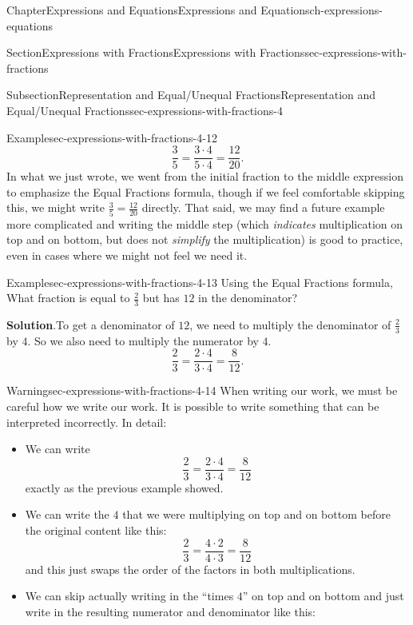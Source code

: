 \documentclass[twoside,11pt,]{book}
\newcommand{\blocktitlefont}{\relax}
\numberwithin{equation}{chapter}
\begin{document}
\begin{chapterptx}{Chapter}{Expressions and Equations}{}{Expressions and Equations}{}{}{ch-expressions-equations}
\begin{sectionptx}{Section}{Expressions with Fractions}{}{Expressions with Fractions}{}{}{sec-expressions-with-fractions}
\begin{subsectionptx}{Subsection}{Representation and Equal\slash{}Unequal Fractions}{}{Representation and Equal\slash{}Unequal Fractions}{}{}{sec-expressions-with-fractions-4}
\begin{example}{Example}{}{sec-expressions-with-fractions-4-12}
\begin{equation*}
\frac35=\frac{3 \cdot 4}{5 \cdot 4}=\frac{12}{20}.
\end{equation*}
In what we just wrote, we went from the initial fraction to the middle expression to emphasize the Equal Fractions formula, though if we feel comfortable skipping this, we might write \(\frac35=\frac{12}{20}\) directly. That said, we may find a future example more complicated and writing the middle step (which \emph{indicates} multiplication on top and on bottom, but does not \emph{simplify} the multiplication) is good to practice, even in cases where we might not feel we need it.%
\end{example}
\begin{example}{Example}{}{sec-expressions-with-fractions-4-13}%
Using the Equal Fractions formula, What fraction is equal to \(\frac23\) but has \(12\) in the denominator?%
\par\smallskip%
\noindent\textbf{\blocktitlefont Solution}.\hypertarget{sec-expressions-with-fractions-4-13-2}{}\quad{}To get a denominator of \(12\), we need to multiply the denominator of \(\frac23\) by \(4\). So we also need to multiply the numerator by \(4\).%
\begin{equation*}
\frac23=\frac{2 \cdot 4}{3 \cdot 4}=\frac{8}{12}.
\end{equation*}
%
\end{example}
\begin{warning}{Warning}{}{sec-expressions-with-fractions-4-14}%
When writing our work, we must be careful how we write our work. It is possible to write something that can be interpreted incorrectly. In detail:%
\begin{itemize}[label=\textbullet]
\item{}We can write%
\begin{equation*}
\frac23=\frac{2 \cdot 4}{3 \cdot 4}=\frac{8}{12}
\end{equation*}
exactly as the previous example showed.%
\item{}We can write the \(4\) that we were multiplying on top and on bottom before the original content like this:%
\begin{equation*}
\frac23=\frac{4 \cdot 2}{4 \cdot 3}=\frac{8}{12}
\end{equation*}
and this just swaps the order of the factors in both multiplications.%
\item{}We can skip actually writing in the ``times \(4\)'' on top and on bottom and just write in the resulting numerator and denominator like this:%

\end{itemize}
\end{warning}
\end{subsectionptx}
\end{sectionptx}
\end{chapterptx}
\end{document}
